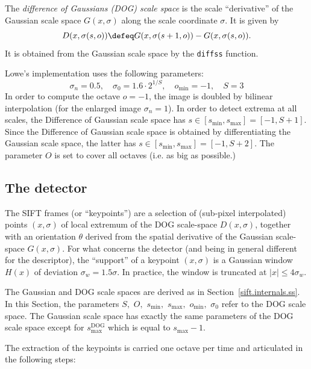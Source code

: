 \documentclass{article}
\let\oldtt=\tt
\renewcommand{\tt}{\oldtt\color{codecolor}}
\begin{document}
\medskip
{} The {\em difference of Gaussians (DOG) scale space} is the scale ``derivative'' of the Gaussian scale space $G(x,\sigma)$ along the scale coordinate $\sigma$. It is given by
\[
  D(x,\sigma(s,o)) \defeq G(x,\sigma(s+1,o)) - G(x,\sigma(s,o)).
\]
It is obtained from the Gaussian scale space by the {\tt diffss} function.

\begin{remark} Lowe's implementation uses the following parameters:
\[
\sigma_n = 0.5,
\quad
\sigma_0 = 1.6\cdot 2^{1/S},
\quad
o_{\min} = -1,
\quad
S =3
\]
In order to compute the octave $o=-1$, the image is doubled by bilinear interpolation (for the enlarged image $\sigma_n=1$). In order to detect extrema at all scales, the Difference of Gaussian scale space has $s\in[s_{\min},s_{\max}]=[-1,S+1]$. Since the Difference of Gaussian scale space is obtained by differentiating the Gaussian scale space, the latter has
$s\in[s_{\min},s_{\max}] = [-1,S+2]$. The parameter $O$ is set to cover all octaves (i.e. as big as possible.)
\end{remark}

\subsection{The detector}\label{sift.internals.detector}

The SIFT frames (or ``keypoints'') are a selection of (sub-pixel interpolated) points $(x,\sigma)$ of local extremum of the DOG scale-space $D(x,\sigma)$, together with an orientation $\theta$ derived from the spatial derivative of the Gaussian scale-space $G(x,\sigma)$. For what concerns the detector (and being in general different for the descriptor), the ``support'' of a keypoint $(x,\sigma)$ is a Gaussian window $H(x)$ of deviation $\sigma_w=1.5\sigma$. In practice, the window is truncated at $|x|\leq 4 \sigma_w$.

The Gaussian and DOG scale spaces are derived as in Section~\ref{sift.internals.ss}. In this Section, the parameters $S,$ $O,$ $s_{\min},$ $s_{\max},$ $o_{\min},$ $\sigma_0$ refer to the DOG scale space. The Gaussian scale space has exactly the same parameters of the DOG scale space except for $s_{\max}^{\text{DOG}}$ which is equal to $s_{\max} - 1$.

The extraction of the keypoints is carried one octave per time and articulated in the following steps:
\end{document}
